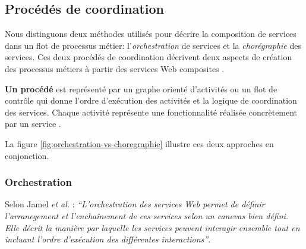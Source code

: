     \subsection{Procédés de coordination}
    \label{sec:proc-de-coord}
    



    Nous distinguons deux méthodes utilisés pour décrire la
    composition de services dans un flot de processus métier:
    l'\emph{orchestration} de services et la \emph{chorégraphie} des
    services. Ces deux procédés de coordination décrivent deux aspects
    de création des processus métiers à partir des services Web
    composites \cite{peltz2003web}.
    
    \textbf{Un procédé} est représenté par un graphe orienté
    d'activités ou un flot de contrôle qui donne l'ordre d'exécution
    des activités et la logique de coordination des services. Chaque
    activité représente une fonctionnalité réalisée concrètement par
    un service \cite{chollet2009orchestration}.

    La figure \ref{fig:orchestration-vs-choregraphie} illustre ces
    deux approches en conjonction.
           

      \subsubsection{Orchestration}
      \label{sec:orchestration-sec}
      Selon Jamel \emph{et al.} \cite{jamal2005environnement}:
      \emph{``L'orchestration des services Web permet de définir
        l'arranegement et l'enchaînement de ces services selon un
        canevas bien défini. Elle décrit la manière par laquelle les
        services peuvent interagir ensemble tout en incluant l'ordre
        d'exécution des différentes interactions''}.

